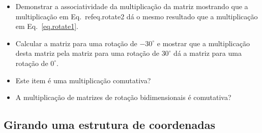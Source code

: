 \begin{framed}
\begin{itemize}
\item Demonstrar a associatividade da multiplicação da matriz mostrando que a multiplicação em Eq.~ref{eq.rotate2} dá o mesmo resultado que a multiplicação em Eq.~\ref{eq.rotate1}.
\item Calcular a matriz para uma rotação de $-30^{\circ}$ e mostrar que a multiplicação desta matriz pela matriz para uma rotação de $30^{\circ}$ dá a matriz para uma rotação de $0^{\circ}$.
\item Este item é uma multiplicação comutativa?
\item A multiplicação de matrizes de rotação bidimensionais é comutativa?
\end{itemize}
\end{framed}

\subsection{Girando uma estrutura de coordenadas}

